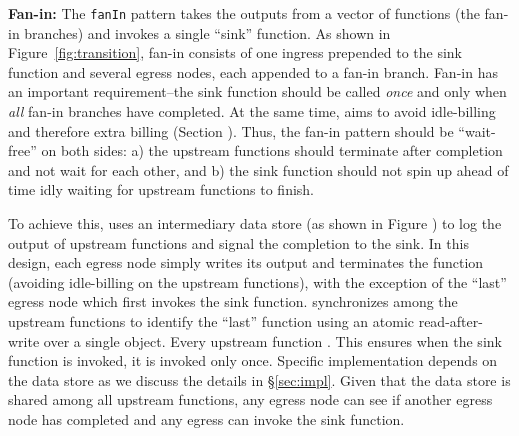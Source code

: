 \noindent\textbf{Fan-in:} The \texttt{fanIn} pattern takes the outputs from a vector of
functions (the fan-in branches) and invokes a single ``sink'' function. As shown in Figure~\ref{fig:transition}, fan-in consists of one ingress prepended to the sink function and several egress nodes, each
appended to a fan-in branch. Fan-in has an important requirement--the sink function should be called \textit{once} and only when \textit{all} fan-in branches have completed. At the same time, \name{} aims to avoid idle-billing and therefore extra billing (Section ). Thus, the fan-in pattern should be ``wait-free'' on both sides: a) the upstream functions should terminate after completion and not wait for each other, and b) the sink function should not  spin up ahead of time idly waiting for upstream functions to finish.

%



To achieve this, \name{} uses an intermediary data store (as shown in Figure ) to log the output of upstream functions and signal the completion to the sink. In this design, each egress  node simply
writes its output and terminates the function (avoiding idle-billing on the upstream functions), with the exception of the ``last'' egress node which first invokes the sink function. \name{} synchronizes among the upstream functions to identify the ``last'' function using an
atomic read-after-write over a single object. Every upstream function .  This ensures when the sink function is
invoked, it is invoked only once.  Specific implementation depends
on the data store as we discuss the details in \S\ref{sec:impl}.  Given that the data store is shared among all upstream functions, any egress node can see if another egress node has completed and any egress can invoke the sink function. 


